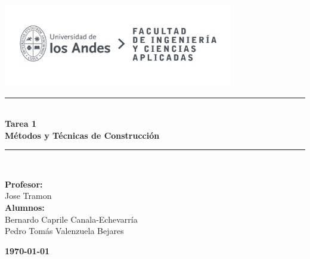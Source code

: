 \documentclass{article} %
\begin{document}
\begin{titlepage}%
\newcommand{\HRule}{\rule{\linewidth}{0.5mm}} 
\center 
\includegraphics[width=10cm]{LOGO_UNIVERSIDAD.jpg}\\ %
\vspace{3cm}
\HRule \\[0.4cm]
{ \huge \bfseries Tarea 1}\\[0.4cm] %
{ \huge \bfseries Métodos y Técnicas de Construcción}\\[0.4cm] %
\HRule \\[1.5cm]
 \vspace{5cm}
\begin{flushright}
    { \textbf{Profesor:}\\
    Jose Tramon\\
    \vspace{0.2cm}
    \textbf{Alumnos:}\\
    Bernardo Caprile Canala-Echevarría\\
    Pedro Tomás Valenzuela Bejares\\
    \vspace{0.2cm}

}
\end{flushright}
\vspace{1cm}
{\large \textbf{\today}}\\[2cm] %
\end{titlepage}
\end{document}
